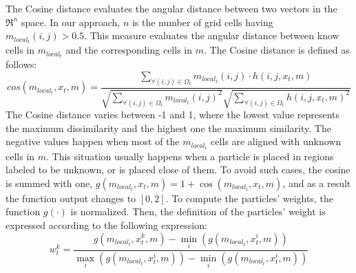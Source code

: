 The Cosine distance evaluates the angular distance between two vectors in the $\Re^n$ space. In our approach, $n$ is the number of grid cells having $m_{local_{t}}(i,j)>0.5$. This measure evaluates the angular distance between know cells in $m_{local_{t}}$ and the corresponding cells in $m$. The Cosine distance is defined as follows:
\begin{equation}
\label{Eq::ch3-4}
cos(m_{local_{t}},x_t,m) = \frac{\sum_{\forall(i,j)\in \Omega_t} m_{local_{t}}(i,j) \cdotp h(i,j,x_t,m)}{\sqrt{\sum_{\forall(i,j)\in \Omega_t}m_{local_{t}}(i,j)^{2}}\sqrt{\sum_{\forall(i,j)\in \Omega_t}h(i,j,x_t,m)^{2}}}
\end{equation}
The Cosine distance varies between -1 and 1, where the lowest value represents the maximum dissimilarity and the highest one the maximum similarity. The negative values happen when most of the $m_{local_{t}}$ cells are aligned with unknown cells in $m$. This situation usually happens when a particle is placed in regions labeled to be unknown, or is placed close of them. To avoid such cases, the cosine is summed with one, $g(m_{local_{t}},x_t,m)=1+\cos(m_{local_{t}},x_t,m)$, and as a result the function output changes to $[0, 2]$. To compute the particles' weights, the function $g(\cdotp)$ is normalized. Then, the definition of the particles' weight is expressed according to the following expression:
\begin{equation}
\label{Eq::ch3-5}
w_t^k = \frac{g(m_{local_{t}},x_t^k,m) - \min_{i}(g(m_{local_{t}},x_t^i,m))}{\max_{i}(g(m_{local_{t}},x_t^i,m)) - \min_{i}(g(m_{local_{t}},x_t^i,m))}
\end{equation}
